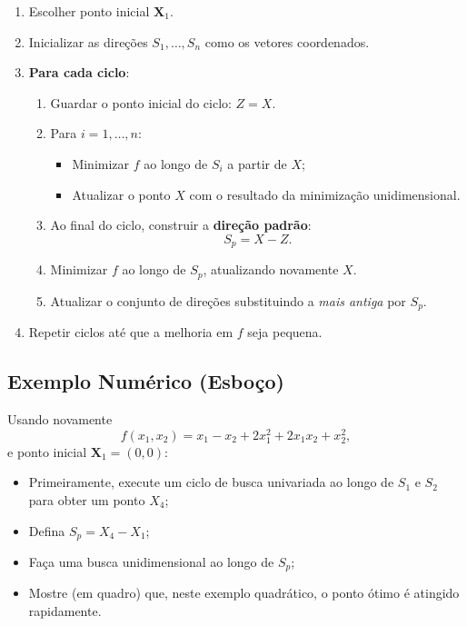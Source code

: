 \documentclass[9pt,a4paper]{extarticle}
\begin{document}
\begin{enumerate}
    \item Escolher ponto inicial $\bm{X}_1$.
    \item Inicializar as direções $S_1,\dots,S_n$ como os vetores coordenados.
    \item \textbf{Para cada ciclo}:
    \begin{enumerate}[label=(\alph*)]
        \item Guardar o ponto inicial do ciclo: $Z = X$.
        \item Para $i=1,\dots,n$:
        \begin{itemize}
            \item Minimizar $f$ ao longo de $S_i$ a partir de $X$;
            \item Atualizar o ponto $X$ com o resultado da minimização unidimensional.
        \end{itemize}
        \item Ao final do ciclo, construir a \textbf{direção padrão}:
        \[
            S_p = X - Z.
        \]
        \item Minimizar $f$ ao longo de $S_p$, atualizando novamente $X$.
        \item Atualizar o conjunto de direções substituindo a \emph{mais antiga} por $S_p$.
    \end{enumerate}
    \item Repetir ciclos até que a melhoria em $f$ seja pequena.
\end{enumerate}

\subsection{Exemplo Numérico (Esboço)}

Usando novamente
\[
    f(x_1,x_2) = x_1 - x_2 + 2x_1^2 + 2x_1x_2 + x_2^2,
\]
e ponto inicial $\bm{X}_1 = (0,0)$:

\begin{itemize}
    \item Primeiramente, execute um ciclo de busca univariada ao longo de $S_1$ e $S_2$ para obter um ponto $X_4$;
    \item Defina $S_p = X_4 - X_1$;
    \item Faça uma busca unidimensional ao longo de $S_p$;
    \item Mostre (em quadro) que, neste exemplo quadrático, o ponto ótimo é atingido rapidamente.
\end{itemize}
\end{document}
